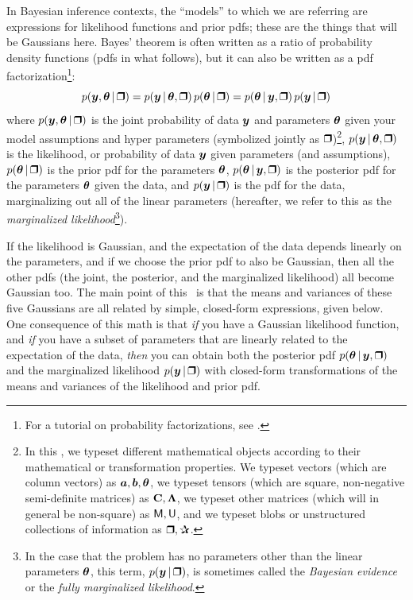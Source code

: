 In Bayesian inference contexts, the ``models'' to which we are referring are
expressions for likelihood functions and prior pdfs; these are the things
that will be Gaussians here.
Bayes' theorem is often written as a ratio of probability density functions
(pdfs in what follows), but it can also be written as a pdf factorization\footnote{For
  a tutorial on probability factorizations, see \cite{probcalc}.}:
\begin{equation}
p(\vy,\vtheta\given\bH) = p(\vy\given\vtheta,\bH)\,p(\vtheta\given\bH) = p(\vtheta\given\vy,\bH)\,p(\vy\given\bH)
\end{equation}
where
$p(\vy,\vtheta\given\bH)$ is the joint probability of data $\boldsymbol{y}$ and
parameters $\boldsymbol{\theta}$ given your model assumptions and hyper parameters
(symbolized jointly as $\bH$)\footnote{%
  In this \documentname, we typeset different mathematical objects according to their mathematical or transformation properties.
  We typeset vectors (which are column vectors) as $\boldsymbol{a}, \boldsymbol{b}, \boldsymbol{\theta}$,
  we typeset tensors (which are square, non-negative semi-definite matrices) as $\mathbf{C}, \mathbf{\Lambda}$,
  we typeset other matrices (which will in general be non-square) as $\mathsf{M}, \mathsf{U}$,
  and we typeset blobs or unstructured
  collections of information as $\bH, \bP$.},
$p(\vy\given\vtheta,\bH)$ is the likelihood, or probability of data $\boldsymbol{y}$
given parameters (and assumptions),
$p(\vtheta\given\bH)$ is the prior pdf for the parameters $\boldsymbol{\theta}$,
$p(\vtheta\given\vy,\bH)$ is the posterior pdf for the parameters $\boldsymbol{\theta}$
given the data,
and
$p(\vy\given\bH)$ is the pdf for the data, marginalizing out all of the linear
parameters (hereafter, we refer to this as the \textsl{marginalized
likelihood}\footnote{In the case that the problem has no parameters other than
the linear parameters $\boldsymbol{\theta}$, this term, $p(\vy \given \bH)$, is sometimes
called the \textsl{Bayesian evidence} or the \textsl{fully marginalized
likelihood}.}).

If the likelihood is Gaussian, and the expectation of the data depends linearly
on the parameters, and if we choose the prior pdf to also be Gaussian, then
all the other pdfs (the joint, the posterior, and the marginalized likelihood)
all become Gaussian too.
The main point of this \documentname\ is that the means and variances of these
five Gaussians are all related by simple, closed-form expressions, given below.
One consequence of this math is that \emph{if} you have a Gaussian
likelihood function, and \emph{if} you have a subset of parameters that are
linearly related to the expectation of the data, \emph{then} you can obtain both
the posterior pdf $p(\vtheta\given\vy,\bH)$ and the marginalized likelihood
$p(\vy\given\bH)$ with closed-form transformations of the means and variances of
the likelihood and prior pdf.

